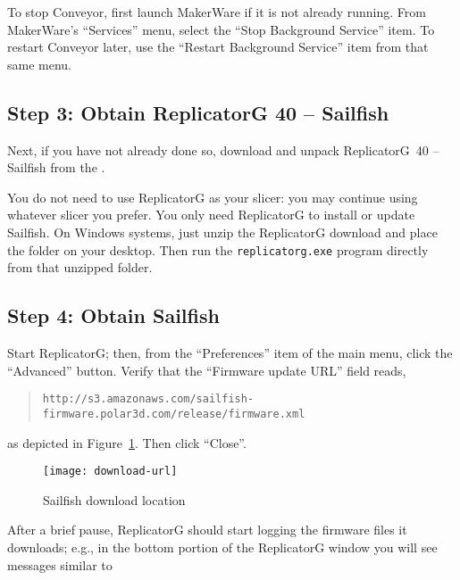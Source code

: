 To stop Conveyor, first
launch MakerWare if it is not already running.  From MakerWare's ``Services''
menu, select the ``Stop Background Service'' item. To restart Conveyor later,
use the ``Restart Background Service'' item from that same menu.


\subsection{Step 3: Obtain ReplicatorG 40 -- Sailfish}

Next, if you have not already done so, download and unpack ReplicatorG~40 --
Sailfish from the
.

You do not need to use ReplicatorG as your \gls{slicer}: you may continue using
whatever \gls{slicer} you prefer.  You only need ReplicatorG to install or update
Sailfish.  On Windows systems, just unzip the ReplicatorG download and place
the folder on your desktop.  Then run the \texttt{replicatorg.exe} program
directly from that unzipped folder.


\subsection{Step 4: Obtain Sailfish} \label{sec:download-url}

Start ReplicatorG; then, from the ``Preferences'' item of the main menu,
click the ``Advanced'' button.  Verify that the ``Firm\-ware update
URL'' field reads,
\begin{quote}
{\hspace{-30pt}\smaller\texttt{http://s3.amazonaws.com/sailfish-firmware.polar3d.com/release/firmware.xml}}
\end{quote}
as depicted in Figure~\ref{fig:download-url}. Then click ``Close''.

\begin{figure}[!htbp]
  \centering
    \texttt{[image: download-url]}
    \caption{Sailfish download location}
  \label{fig:download-url}
\end{figure}

After a brief pause, ReplicatorG should start logging the firmware files it
downloads; e.g., in the bottom portion of the ReplicatorG window you will
see messages similar to

